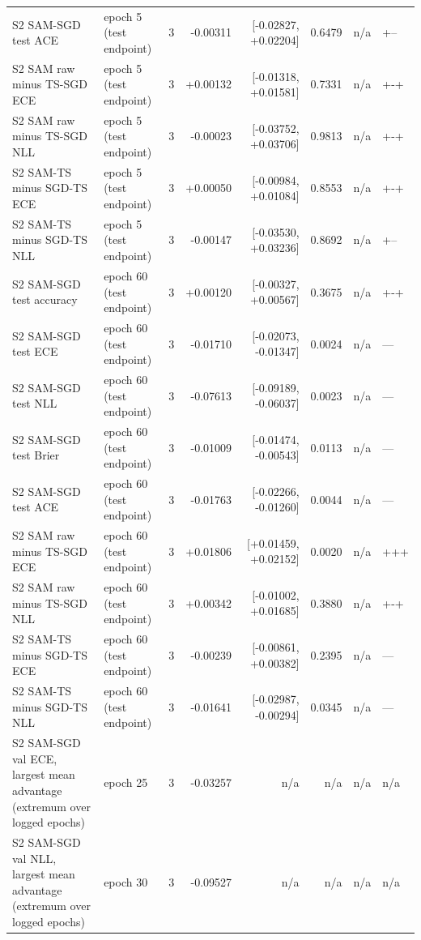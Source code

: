 \documentclass[11pt,letterpaper]{article}
\begin{document}
{\begin{longtable}{>{\raggedright\arraybackslash}p{3.6cm}lrrrrrl}
S2 SAM-SGD test ACE & epoch 5 (test endpoint) & 3 & -0.00311 & [-0.02827, +0.02204] & 0.6479 & n/a & +-- \\
S2 SAM raw minus TS-SGD ECE & epoch 5 (test endpoint) & 3 & +0.00132 & [-0.01318, +0.01581] & 0.7331 & n/a & +-+ \\
S2 SAM raw minus TS-SGD NLL & epoch 5 (test endpoint) & 3 & -0.00023 & [-0.03752, +0.03706] & 0.9813 & n/a & +-+ \\
S2 SAM-TS minus SGD-TS ECE & epoch 5 (test endpoint) & 3 & +0.00050 & [-0.00984, +0.01084] & 0.8553 & n/a & +-+ \\
S2 SAM-TS minus SGD-TS NLL & epoch 5 (test endpoint) & 3 & -0.00147 & [-0.03530, +0.03236] & 0.8692 & n/a & +-- \\
S2 SAM-SGD test accuracy & epoch 60 (test endpoint) & 3 & +0.00120 & [-0.00327, +0.00567] & 0.3675 & n/a & +-+ \\
S2 SAM-SGD test ECE & epoch 60 (test endpoint) & 3 & -0.01710 & [-0.02073, -0.01347] & 0.0024 & n/a & --- \\
S2 SAM-SGD test NLL & epoch 60 (test endpoint) & 3 & -0.07613 & [-0.09189, -0.06037] & 0.0023 & n/a & --- \\
S2 SAM-SGD test Brier & epoch 60 (test endpoint) & 3 & -0.01009 & [-0.01474, -0.00543] & 0.0113 & n/a & --- \\
S2 SAM-SGD test ACE & epoch 60 (test endpoint) & 3 & -0.01763 & [-0.02266, -0.01260] & 0.0044 & n/a & --- \\
S2 SAM raw minus TS-SGD ECE & epoch 60 (test endpoint) & 3 & +0.01806 & [+0.01459, +0.02152] & 0.0020 & n/a & +++ \\
S2 SAM raw minus TS-SGD NLL & epoch 60 (test endpoint) & 3 & +0.00342 & [-0.01002, +0.01685] & 0.3880 & n/a & +-+ \\
S2 SAM-TS minus SGD-TS ECE & epoch 60 (test endpoint) & 3 & -0.00239 & [-0.00861, +0.00382] & 0.2395 & n/a & --- \\
S2 SAM-TS minus SGD-TS NLL & epoch 60 (test endpoint) & 3 & -0.01641 & [-0.02987, -0.00294] & 0.0345 & n/a & --- \\
S2 SAM-SGD val ECE, largest mean advantage (extremum over logged epochs) & epoch 25 & 3 & -0.03257 & n/a & n/a & n/a & n/a \\
S2 SAM-SGD val NLL, largest mean advantage (extremum over logged epochs) & epoch 30 & 3 & -0.09527 & n/a & n/a & n/a & n/a \\
\end{longtable}}
\end{document}
